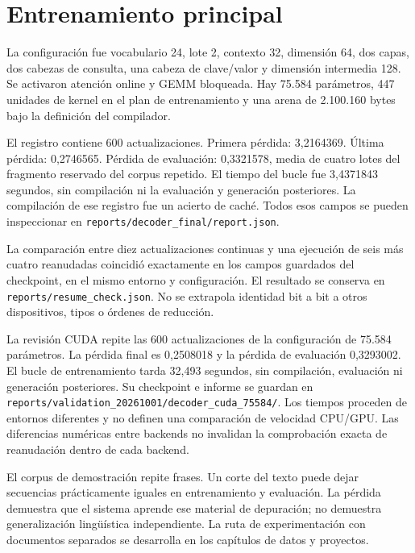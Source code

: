 \documentclass[12pt,a4paper,oneside]{report}
\begin{document}
\section{Entrenamiento principal}
La configuración fue vocabulario 24, lote 2, contexto 32, dimensión 64, dos capas, dos cabezas de consulta, una cabeza de clave/valor y dimensión intermedia 128. Se activaron atención online y GEMM bloqueada. Hay 75.584 parámetros, 447 unidades de kernel en el plan de entrenamiento y una arena de 2.100.160 bytes bajo la definición del compilador.

El registro contiene 600 actualizaciones. Primera pérdida: 3,2164369. Última pérdida: 0,2746565. Pérdida de evaluación: 0,3321578, media de cuatro lotes del fragmento reservado del corpus repetido. El tiempo del bucle fue 3,4371843 segundos, sin compilación ni la evaluación y generación posteriores. La compilación de ese registro fue un acierto de caché. Todos esos campos se pueden inspeccionar en \texttt{reports/decoder\_final/report.json}.

La comparación entre diez actualizaciones continuas y una ejecución de seis más cuatro reanudadas coincidió exactamente en los campos guardados del checkpoint, en el mismo entorno y configuración. El resultado se conserva en \texttt{reports/resume\_check.json}. No se extrapola identidad bit a bit a otros dispositivos, tipos o órdenes de reducción.

La revisión CUDA repite las 600 actualizaciones de la configuración de 75.584 parámetros. La pérdida final es 0,2508018 y la pérdida de evaluación 0,3293002. El bucle de entrenamiento tarda 32,493 segundos, sin compilación, evaluación ni generación posteriores. Su checkpoint e informe se guardan en \texttt{reports/validation\_20261001/decoder\_cuda\_75584/}. Los tiempos proceden de entornos diferentes y no definen una comparación de velocidad CPU/GPU. Las diferencias numéricas entre backends no invalidan la comprobación exacta de reanudación dentro de cada backend.

\begin{cuidado}
El corpus de demostración repite frases. Un corte del texto puede dejar secuencias prácticamente iguales en entrenamiento y evaluación. La pérdida demuestra que el sistema aprende ese material de depuración; no demuestra generalización lingüística independiente. La ruta de experimentación con documentos separados se desarrolla en los capítulos de datos y proyectos.
\end{cuidado}
\end{document}
